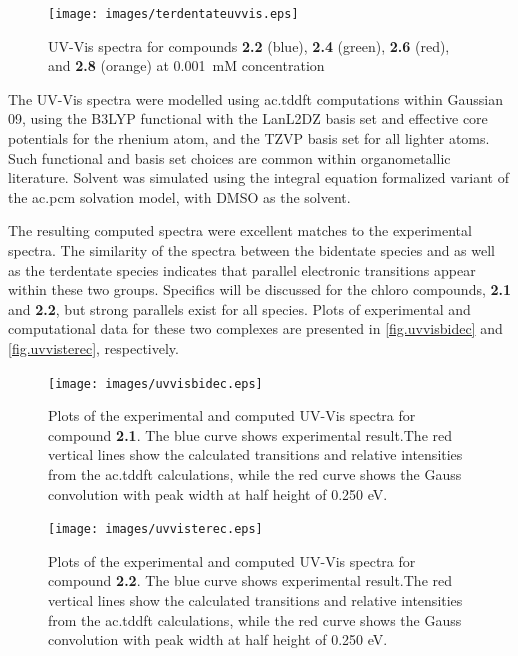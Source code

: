 \begin{figure}[!htb]
\centering
 \texttt{[image: images/terdentateuvvis.eps]}
 \caption[UV-Vis spectra for compounds \textbf{2.2}, \textbf{2.4}, \textbf{2.6}, and \textbf{2.8}]{UV-Vis spectra for compounds \textbf{2.2} (blue), \textbf{2.4} (green), \textbf{2.6} (red), and \textbf{2.8} (orange) at 0.001~mM concentration}
 \label{fig.uvvisters}
\end{figure} 

The UV-Vis spectra were modelled using \gls{ac.tddft} computations within Gaussian 09, using the B3LYP functional with the LanL2DZ basis set and effective core potentials for the rhenium atom, and the TZVP basis set for all lighter atoms. Such functional and basis set choices are common within organometallic literature. Solvent was simulated using the integral equation formalized variant of the \gls{ac.pcm} solvation model, with DMSO as the solvent. 

The resulting computed spectra were excellent matches to the experimental spectra. The similarity of the spectra between the bidentate species and as well as the terdentate species indicates that parallel electronic transitions appear within these two groups. Specifics will be discussed for the chloro compounds, \textbf{2.1} and \textbf{2.2}, but strong parallels exist for all species. Plots of experimental and computational data for these two complexes are presented in \autoref{fig.uvvisbidec} and \autoref{fig.uvvisterec}, respectively.

\begin{figure}[!htb]
 \centering
  \texttt{[image: images/uvvisbidec.eps]}
 \caption[Plots of the experimental and computed UV-Vis spectra for compound \textbf{2.1}]{Plots of the experimental and computed UV-Vis spectra for compound \textbf{2.1}. The blue curve shows experimental result.The red vertical lines show the calculated transitions and relative intensities from the \gls{ac.tddft} calculations, while the red curve shows the Gauss convolution with peak width at half height of 0.250 eV.}
 \label{fig.uvvisbidec}
\end{figure}

\begin{figure}[!htb]
 \centering
  \texttt{[image: images/uvvisterec.eps]}
 \caption[Plots of the experimental and computed UV-Vis spectra for compound \textbf{2.2}]{Plots of the experimental and computed UV-Vis spectra for compound \textbf{2.2}.  The blue curve shows experimental result.The red vertical lines show the calculated transitions and relative intensities from the \gls{ac.tddft} calculations, while the red curve shows the Gauss convolution with peak width at half height of 0.250 eV.}
 \label{fig.uvvisterec}
\end{figure}

